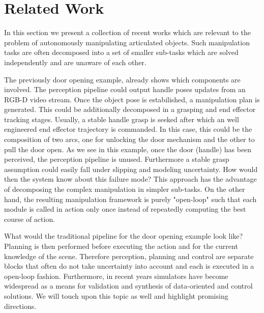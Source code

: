 \section{Related Work}
\label{sec:Related Work}


In this section we present a collection of recent works which are relevant to the problem of autonomously manipulating articulated objects. Such manipulation tasks are often decomposed into a set of smaller sub-tasks which are solved independently and are unaware of each other. 

The previously door opening example, already shows which components are involved. The perception pipeline could output handle poses updates from an RGB-D video stream. Once the object pose is estabilished, a manipulation plan is generated. This could be additionally decomposed in a grasping and end effector tracking stages. Usually, a stable handle grasp is seeked after which an well engineered end effector trajectory is commanded. In this case, this could be the composition of two arcs, one for unlocking the door mechanism and the other to pull the door open. As we see in this example, once the door (handle) has been perceived, the perception pipeline is unused. Furthermore a stable grasp assumption could easily fall under slipping and modeling uncertainty. How would then the system know about this failure mode? This approach has the advantage of decomposing the complex manipulation in simpler sub-tasks. On the other hand, the resulting manipulation framework is purely "open-loop" such that each module is called in action only once instead of repeatedly computing the best course of action.      


What would the traditional pipeline for the door opening example look like? Planning is then performed before executing the action and for the current knowledge of the scene. Therefore perception, planning and control are separate blocks that often do not take uncertainty into account and each is executed in a open-loop fashion. Furthermore, in recent years simulators have become widespread as a means for validation and synthesis of data-oriented and control solutions. We will touch upon this topic as well and highlight promising directions.

